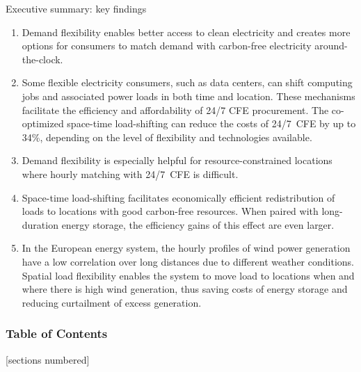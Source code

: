 \begin{frame}{Executive summary: key findings}

  \centering
  {\footnotesize

    \begin{enumerate}

      \item Demand flexibility enables \alert{better access to clean electricity} and creates \alert{more options} for consumers to match demand with carbon-free electricity around-the-clock. 

      \item Some flexible electricity consumers, such as data centers, can shift computing jobs and associated power loads in both time and location. These mechanisms facilitate the \alert{efficiency and affordability} of 24/7 CFE procurement. The co-optimized space-time load-shifting can reduce the costs of 24/7~CFE by up to 34\%, depending on the level of flexibility and technologies available.

      \item Demand flexibility is \alert{especially helpful for resource-constrained locations} where hourly matching with 24/7~CFE is difficult.

      \item Space-time load-shifting facilitates \alert{economically efficient redistribution of loads} to locations with good carbon-free resources. When paired with long-duration energy storage, the efficiency gains of this effect are even larger.
      
      \item In the European energy system, the hourly profiles of wind power generation have a low correlation over long distances due to different weather conditions. 
      Spatial load flexibility enables the system to move load to locations when and where there is high wind generation, thus \alert{saving costs of energy storage} and \alert{reducing curtailment} of excess generation. 
      
  \end{enumerate}
  }
  
\end{frame}



\begin{frame}
  \frametitle{Table of Contents}
  {\small
  [sections numbered]
  \tableofcontents[hideallsubsections]
  }
\end{frame}


